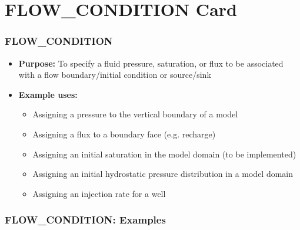 \section{FLOW\_CONDITION Card}

\begin{frame}\frametitle{FLOW\_CONDITION}

\begin{itemize}
\item[] \textbf{Purpose:} To specify a fluid pressure, saturation, or flux to be associated with a flow boundary/initial condition or source/sink
\item[] \textbf{Example uses:}
\begin{itemize}
  \item Assigning a pressure to the vertical boundary of a model
  \item Assigning a flux to a boundary face (e.g. recharge)
  \item Assigning an initial saturation in the model domain (to be implemented)
  \item Assigning an initial hydrostatic pressure distribution in a model domain
  \item Assigning an injection rate for a well
\end{itemize}
\end{itemize}

\end{frame}

\begin{frame}[fragile]\frametitle{FLOW\_CONDITION: Examples}

\begin{semiverbatim}
\scriptsize

\end{semiverbatim}


\end{frame}
